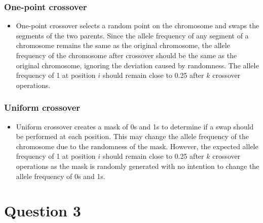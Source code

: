 \documentclass[12pt,letterpaper]{article}
\begin{document}
\subsubsection*{One-point crossover}
\begin{itemize}
    \item One-point crossover selects a random point on the chromosome and swaps the segments of the two parents. Since the allele frequency of any segment of a chromosome remains the same as the original chromosome, the allele frequency of the chromosome after crossover should be the same as the original chromosome, ignoring the deviation caused by randomness. The allele frequency of 1 at position $i$ should remain close to 0.25 after $k$ crossover operations.
\end{itemize}
\subsubsection*{Uniform crossover}
\begin{itemize}
    \item Uniform crossover creates a mask of 0s and 1s to determine if a swap should be performed at each position. This may change the allele frequency of the chromosome due to the randomness of the mask. However, the expected allele frequency of 1 at position $i$ should remain close to 0.25 after $k$ crossover operations as the mask is randomly generated with no intention to change the allele frequency of 0s and 1s.
\end{itemize}

\section*{Question 3}

\end{document}
